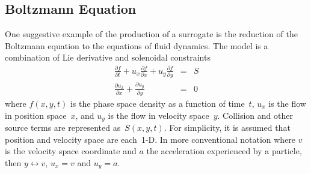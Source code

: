 \subsection{Boltzmann Equation}\label{sec:boltz}
One suggestive example of the production of a surrogate is the reduction of the Boltzmann equation to 
the equations of fluid dynamics. The model is a combination of Lie derivative and solenoidal constraints
\begin{eqnarray}\label{eq:lie}
 \frac{\partial f}{\partial t} + u_x  \frac{\partial f}{\partial x} + u_y  \frac{\partial f}{\partial y} &=& S\\
 \frac{\partial u_x}{\partial x} +  \frac{\partial u_y}{\partial y} &=& 0 \label{eq:sol}
\end{eqnarray}
where $f(x,y,t)$ is the phase space density as a function of time~$t$,
$u_x$ is the flow in position space~$x$, and $u_y$ is the flow in velocity space~$y$.
Collision and other source terms are represented as~$S(x,y,t)$.
For simplicity, it is assumed that position and velocity space are each~1-D. In more conventional
notation where $v$ is the velocity space coordinate and $a$ the acceleration experienced by
a particle, then  $y \leftrightarrow v$, $u_x=v$  and $u_y = a$.

